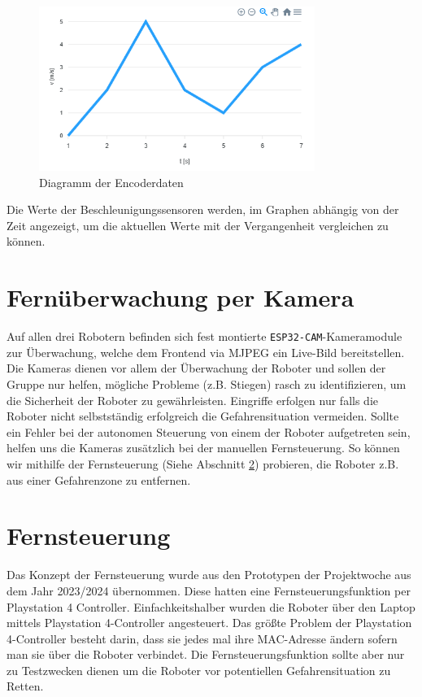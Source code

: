 \begin{figure}[H]
    \includegraphics[width=0.8\textwidth, center]{img/encoder_chart.png}
    \caption{Diagramm der Encoderdaten}
    \label{fig:Encoderdaten}
\end{figure}

Die Werte der Beschleunigungssensoren werden,
im Graphen abhängig von der Zeit angezeigt, 
um die aktuellen Werte mit der Vergangenheit vergleichen zu können.

\section{Fernüberwachung per Kamera}
\label{subsec:frontend_cam_stream}
Auf allen drei Robotern befinden sich fest montierte
\texttt{ESP32-CAM}-Kameramodule zur Überwachung,
welche dem Frontend via MJPEG ein Live-Bild bereitstellen.
%
Die Kameras dienen vor allem der Überwachung der Roboter und sollen der Gruppe nur helfen,
mögliche Probleme (z.B. Stiegen) rasch zu identifizieren,
um die Sicherheit der Roboter zu gewährleisten.
%
Eingriffe erfolgen nur falls die Roboter nicht selbstständig erfolgreich die Gefahrensituation vermeiden.
%
Sollte ein Fehler bei der autonomen Steuerung von einem der Roboter aufgetreten sein,
helfen uns die Kameras zusätzlich bei der manuellen Fernsteuerung.
%
So können wir mithilfe der Fernsteuerung (Siehe Abschnitt \ref{subsec:frontend_control}) probieren,
die Roboter z.B. aus einer Gefahrenzone zu entfernen.

\section{Fernsteuerung}
\label{subsec:frontend_control}
Das Konzept der Fernsteuerung wurde aus den Prototypen der Projektwoche aus dem Jahr 2023/2024 übernommen.
%
Diese hatten eine Fernsteuerungsfunktion per Playstation 4 Controller. Einfachkeitshalber wurden die Roboter über 
den Laptop mittels Playstation 4-Controller angesteuert. 
%
Das größte Problem der Playstation 4-Controller besteht darin, dass sie jedes mal ihre MAC-Adresse ändern sofern
man sie über die Roboter verbindet.  
%
Die Fernsteuerungsfunktion sollte aber nur zu Testzwecken dienen um die Roboter 
vor potentiellen Gefahrensituation zu Retten. 


